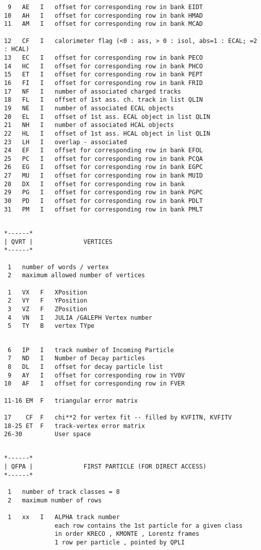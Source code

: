 \begin{verbatim}
 9   AE   I   offset for corresponding row in bank EIDT
10   AH   I   offset for corresponding row in bank HMAD
11   AM   I   offset for corresponding row in bank MCAD
 
12   CF   I   calorimeter flag (<0 : ass, > 0 : isol, abs=1 : ECAL; =2 : HCAL)
13   EC   I   offset for corresponding row in bank PECO
14   HC   I   offset for corresponding row in bank PHCO
15   ET   I   offset for corresponding row in bank PEPT
16   FI   I   offset for corresponding row in bank FRID
17   NF   I   number of associated charged tracks
18   FL   I   offset of 1st ass. ch. track in list QLIN
19   NE   I   number of associated ECAL objects
20   EL   I   offset of 1st ass. ECAL object in list QLIN
21   NH   I   number of associated HCAL objects
22   HL   I   offset of 1st ass. HCAL object in list QLIN
23   LH   I   overlap - associated
24   EF   I   offset for corresponding row in bank EFOL
25   PC   I   offset for corresponding row in bank PCQA
26   EG   I   offset for corresponding row in bank EGPC
27   MU   I   offset for corresponding row in bank MUID
28   DX   I   offset for corresponding row in bank
29   PG   I   offset for corresponding row in bank PGPC
30   PD   I   offset for corresponding row in bank PDLT
31   PM   I   offset for corresponding row in bank PMLT
 
\end{verbatim}
 
\begin{verbatim}
*------*
| QVRT |              VERTICES
*------*
 
 1   number of words / vertex
 2   maximum allowed number of vertices
 
 1   VX   F   XPosition
 2   VY   F   YPosition
 3   VZ   F   ZPosition
 4   VN   I   JULIA /GALEPH Vertex number
 5   TY   B   vertex TYpe
 
\end{verbatim}
 
\begin{verbatim}
 6   IP   I   track number of Incoming Particle
 7   ND   I   Number of Decay particles
 8   DL   I   offset for decay particle list
 9   AY   I   offset for corresponding row in YV0V
10   AF   I   offset for corresponding row in FVER
 
11-16 EM  F   triangular error matrix
 
17    CF  F   chi**2 for vertex fit -- filled by KVFITN, KVFITV
18-25 ET  F   track-vertex error matrix
26-30         User space
 
\end{verbatim}
\begin{verbatim}
*------*
| QFPA |              FIRST PARTICLE (FOR DIRECT ACCESS)
*------*
 
 1   number of track classes = 8
 2   maximum number of rows
 
 1   xx   I   ALPHA track number
              each row contains the 1st particle for a given class
              in order KRECO , KMONTE , Lorentz frames
              1 row per particle , pointed by QPLI
 
\end{verbatim}
 
